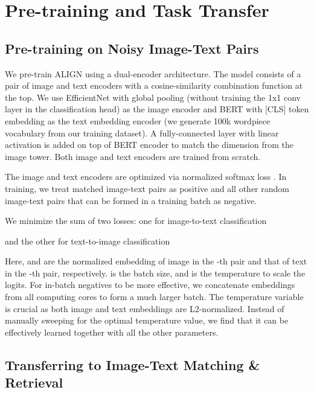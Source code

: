 \documentclass{article}
\begin{document}
\section{Pre-training and Task Transfer}
\subsection{Pre-training on Noisy Image-Text Pairs}
We pre-train ALIGN using a dual-encoder architecture. The model consists of a pair of image and text encoders with a cosine-similarity combination function at the top. We use EfficientNet with global pooling (without training the 1x1 conv layer in the classification head) as the image encoder and BERT with [CLS] token embedding as the text embedding encoder (we generate 100k wordpiece vocabulary from our training dataset). A fully-connected layer with linear activation is added on top of BERT encoder to match the dimension from the image tower. Both image and text encoders are trained from scratch. 

The image and text encoders are optimized via normalized softmax loss \cite{zhai:norm_softmax}. In training, we treat matched image-text pairs as positive and all other random image-text pairs that can be formed in a training batch as negative.

We minimize the sum of two losses: one for image-to-text classification
\vspace{-0.2cm}

\vspace{-0.2cm}
and the other for text-to-image classification

\vspace{-0.4cm}

Here,  and  are the normalized embedding of image in the -th pair and that of text in the -th pair, respectively.  is the  batch size, and  is the temperature to scale the logits. For in-batch negatives to be more effective, we concatenate embeddings from all computing cores to form a much larger batch. The temperature variable is crucial as both image and text embeddings are L2-normalized. Instead of manually sweeping for the optimal temperature value, we find that it can be effectively learned together with all the other parameters.

\vspace{-0.2cm}
\subsection{Transferring to Image-Text Matching \& Retrieval}
\end{document}
